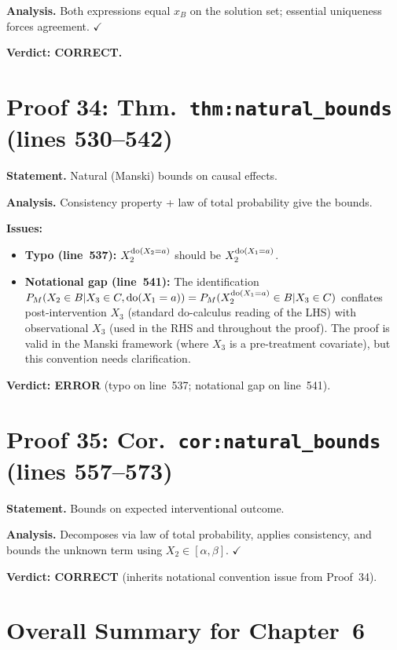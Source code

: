 \documentclass{article}
\begin{document}
\textbf{Analysis.} Both expressions equal $x_B$ on the solution set; essential
uniqueness forces agreement.  $\checkmark$

\textbf{Verdict: CORRECT.}

\section{Proof 34: Thm.\ \texttt{thm:natural\_bounds} (lines 530--542)}
\textbf{Statement.} Natural (Manski) bounds on causal effects.

\textbf{Analysis.} Consistency property + law of total probability give the
bounds.

\textbf{Issues:}
\begin{itemize}
  \item \textbf{Typo (line~537):} $X_2^{\operatorname{do}(X_2=a)}$ should be
    $X_2^{\operatorname{do}(X_1=a)}$.
  \item \textbf{Notational gap (line~541):} The identification
    $P_M(X_2\in B|X_3\in C,\operatorname{do}(X_1=a)) = P_M(X_2^{\operatorname{do}(X_1=a)}\in B|X_3\in C)$
    conflates post-intervention $X_3$ (standard do-calculus reading of the LHS)
    with observational $X_3$ (used in the RHS and throughout the proof).
    The proof is valid in the Manski framework (where $X_3$ is a pre-treatment
    covariate), but this convention needs clarification.
\end{itemize}

\textbf{Verdict: ERROR} (typo on line~537; notational gap on line~541).

\section{Proof 35: Cor.\ \texttt{cor:natural\_bounds} (lines 557--573)}
\textbf{Statement.} Bounds on expected interventional outcome.

\textbf{Analysis.} Decomposes via law of total probability, applies
consistency, and bounds the unknown term using $X_2\in[\alpha,\beta]$.
$\checkmark$

\textbf{Verdict: CORRECT} (inherits notational convention issue from Proof~34).

\section*{Overall Summary for Chapter~6}
\end{document}
